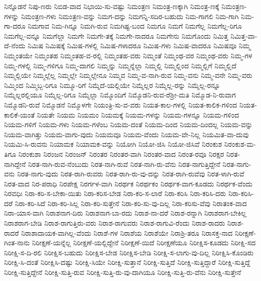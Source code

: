 {ನಿನ್ನೊಡನೆ
ನಿಪು-ಣರು
ನಿಬಿಡ-ವಾದ
ನಿಭಾಯಿ-ಸು-ವಷ್ಟು
ನಿಮಂತ್ರಣ
ನಿಮಂತ್ರ-ಣಕ್ಕಾಗಿ
ನಿಮಂತ್ರ-ಣಕ್ಕೆ
ನಿಮಂತ್ರಣ-ಗಳನ್ನು
ನಿಮಂತ್ರಣ-ಗಳು
ನಿಮಂತ್ರಣ-ವನ್ನು
ನಿಮಗ-ದನ್ನು
ನಿಮಗನ್ನಿ-ಸದಿರ-ಬಹುದು
ನಿಮ-ಗಾಗಲಿ
ನಿಮ-ಗಾಗಿ
ನಿಮ-ಗಾ-ದರೂ
ನಿಮಗಾವ
ನಿಮ-ಗಿನ್ನೂ
ನಿಮಗಿ-ರುವ
ನಿಮಗಿಷ್ಟ-ಬಂದ
ನಿಮಗೂ
ನಿಮಗೆ
ನಿಮಗೆಲ್ಲ
ನಿಮಗೆಲ್ಲ-ರಿಗೂ
ನಿಮಗೆಲ್ಲ-ವನ್ನೂ
ನಿಮಗೆಲ್ಲಾ
ನಿಮಗೇ
ನಿಮಗೇ-ತಕ್ಕೆ
ನಿಮಗೇ-ನಾದರೂ
ನಿಮಗೇನು
ನಿಮಗೊಂದು
ನಿಮಿತ್ತ
ನಿಮಿತ್ತ-ವಾ-ದೆ-ನೆಂದು
ನಿಮಿಷ
ನಿಮಿಷಕ್ಕೆ
ನಿಮಿಷ-ಗಳಲ್ಲಿ
ನಿಮಿಷ-ಗಳಾದರೂ
ನಿಮಿಷ-ಗಳು
ನಿಮಿಷ-ವಾದರೂ
ನಿಮಿಷವೂ
ನಿಮ್ಮ
ನಿಮ್ಮಂತಯೇ
ನಿಮ್ಮಂತಹ
ನಿಮ್ಮಂತಹ-ವ-ರಲ್ಲಿ
ನಿಮ್ಮಂತಹ-ವರು
ನಿಮ್ಮಂತೆ
ನಿಮ್ಮಂಥ-ವರ
ನಿಮ್ಮಂಥ-ವರು
ನಿಮ್ಮ-ಗಳ
ನಿಮ್ಮ-ಗಳಲ್ಲಿ
ನಿಮ್ಮ-ಗಳಿಗೂ
ನಿಮ್ಮ-ದಾಗಲಿ
ನಿಮ್ಮನ್ನು
ನಿಮ್ಮನ್ನೆಲ್ಲಾ
ನಿಮ್ಮಲ್ಲಿ
ನಿಮ್ಮಲ್ಲಿಂದ
ನಿಮ್ಮಲ್ಲಿಗೆ
ನಿಮ್ಮಲ್ಲಿದೆ
ನಿಮ್ಮಲ್ಲಿಯೇ
ನಿಮ್ಮಲ್ಲೆಲ್ಲ
ನಿಮ್ಮಲ್ಲೇ
ನಿಮ್ಮಲ್ಲೇನೂ
ನಿಮ್ಮವ
ನಿಮ್ಮ-ವ-ನಾಗಿ-ರುವ
ನಿಮ್ಮ-ವನು
ನಿಮ್ಮ-ವನೇ
ನಿಮ್ಮ-ವರು
ನಿಮ್ಮಿಂದ
ನಿಮ್ಮಿಬ್ಬ-ರಿಗೂ
ನಿಮ್ಮೂ-ರಿಗೆ
ನಿಮ್ಮೆದೆ-ಯಲ್ಲಿಯೇ
ನಿಮ್ಮೆಲ್ಲರ
ನಿಮ್ಮೆಲ್ಲ-ರನ್ನು
ನಿಮ್ಮೆಲ್ಲ-ರನ್ನೂ
ನಿಮ್ಮೆಲ್ಲರಲ್ಲಿಯೂ
ನಿಮ್ಮೆಲ್ಲ-ರಿಗೂ
ನಿಮ್ಮೆಲ್ಲಾ
ನಿಮ್ಮೊಂದಿಗೆ
ನಿಮ್ಮೊಡನಿ-ರುವ-ರೆಶ್ರೀ-ಮತಿ
ನಿಮ್ಮೊಡ-ನಿ-ರುವಾಗ
ನಿಮ್ಮೊಡನಿ-ರುವೆ
ನಿಮ್ಮೊಡನೆ
ನಿಮ್ಮೊಳಗೇ
ನಿಯಂತ್ರಿ-ಸು-ವ-ವರು
ನಿಯತ-ಕಾಲ-ಗಳಲ್ಲಿ
ನಿಯತ-ಕಾಲಿಕ-ಗಳಿಂದ
ನಿಯತ-ಕಾಲಿಕೆ-ಯಂತೆ
ನಿಯತೇ
ನಿಯಮ
ನಿಯಮಂ
ನಿಯಮಕ್ಕೆ
ನಿಯಮ-ಗಳನ್ನು
ನಿಯಮ-ಗಳನ್ನೂ
ನಿಯಮ-ಗಳಿಂದ
ನಿಯಮ-ಗಳಿಗೆ
ನಿಯಮ-ಗಳು
ನಿಯಮ-ಗಳೆಂಬ
ನಿಯಮ-ದಂತೆ
ನಿಯಮ-ದಿಂದ
ನಿಯಮ-ದಿಂದಲ್ಲ
ನಿಯಮ-ವನ್ನು
ನಿಯಮ-ವಾಗಿತ್ತು
ನಿಯಮ-ವಾಗು-ವುದು
ನಿಯಮವೂ
ನಿಯಮ-ವೆಂದು
ನಿಯಮ-ವೇ-ನಿಲ್ಲ
ನಿಯಮಿತ-ವಾ-ದುವು
ನಿಯಮಿ-ಸಿ-ರುವನು
ನಿಯಾಮಕ
ನಿಯಾಮಕ-ವನ್ನು
ನಿಯೋಗಿ
ನಿಯೋ-ಜಿಸಿ
ನಿಯೋ-ಜಿಸಿವೆ
ನಿರಂಕುಶ
ನಿರಂಕುಶ-ಮ-ತಿಗೂ
ನಿರಂಕುಶಾ
ನಿರಂಜನ
ನಿರಂಜನ್
ನಿರಂತರ
ನಿರಂತರ-ವಾಗಿ
ನಿರಂತರ-ವಾದ
ನಿರಂತ-ರವೂ
ನಿರಕ್ಷರ
ನಿರತ-ನಾಗಿದ್ದೇನೆ
ನಿರತ-ನಾಗಿ-ರುವ-ನೆಂಬುದು
ನಿರತ-ನಾಗಿ-ರುವೆ
ನಿರತ-ನಾಗಿ-ರು-ವೆನು
ನಿರತ-ನಾಗುತ್ತಿದ್ದೇನೆ
ನಿರತ-ನಾಗು-ವನು
ನಿರತ-ನಾಗು-ವುದು
ನಿರತ-ರಾಗಿ-ರುವರು
ನಿರತ-ರಾಗಿ-ರು-ವು-ದನ್ನು
ನಿರತ-ರಾಗಿ-ರುವೆವು
ನಿರತ-ಳಾಗಿ-ರುವೆ
ನಿರತ-ವಾದ
ನಿರ-ಪರಾಧಿ
ನಿರಪೇಕ್ಷ
ನಿರರ್ಗಳ-ವಾಗಿ
ನಿರರ್ಥಕ
ನಿರರ್ಥಕಂ
ನಿರರ್ಥಕ-ವಾಗ-ಕೂಡದು
ನಿರರ್ಥಕ-ವೆಂದು
ನಿರವಧಿಃ
ನಿರಾ-ಕರಿ-ಸ-ಬೇಕಾ-ಯಿತು
ನಿರಾ-ಕರಿಸ-ಬೇಡ
ನಿರಾ-ಕರಿ-ಸ-ಲಾರೆ
ನಿರಾ-ಕರಿಸಿ
ನಿರಾ-ಕರಿಸಿ-ದರು
ನಿರಾ-ಕರಿಸಿ-ದರೆ
ನಿರಾ-ಕರಿ-ಸಿದೆ
ನಿರಾ-ಕರಿ-ಸಿಲ್ಲ
ನಿರಾ-ಕರಿ-ಸುತ್ತೇನೆ
ನಿರಾ-ಕರಿ-ಸು-ವು-ದಿಲ್ಲ
ನಿರಾ-ಕರಿಸು-ವೆವು
ನಿರಾತಂಕ-ವಾದ
ನಿರಾ-ಯಾಸ-ವಾಗಿ
ನಿರಾಶನಾಗ-ದಿರು
ನಿರಾಶನಾಗ-ಬಾ-ರದು
ನಿರಾಶ-ನಾ-ದರೆ
ನಿರಾಶ-ರನ್ನಾಗಿ
ನಿರಾಶರಾಗ-ಬೇಕಿಲ್ಲ
ನಿರಾಶರಾಗ-ಬೇಡಿ
ನಿರಾಶ-ರಾಗುತ್ತಿರು-ವರು
ನಿರಾಶ-ರಾಗುವರು
ನಿರಾಶ-ರಾಗುವಿ-ರೆಂದು
ನಿರಾಶ-ರಾದರು
ನಿರಾಶ-ರಾದರೆ
ನಿರಾಶಾದಾಯಕ-ವಾಗಿಲ್ಲ-ವೆಂದು
ನಿರಾಶೆ-ಗಳ
ನಿರಾಶೆಯ
ನಿರಾಶೆಯೇ
ನಿರಾಶ್ರಿ-ತರೂ
ನಿರಾಸಕ್ತ-ನಾದ
ನಿರೀಕ್ಷಣೆ-ಗಿಂತ-ನಾನು
ನಿರೀಕ್ಷಣೆ-ಯನ್ನೆಲ್ಲ
ನಿರೀಕ್ಷಣೆ-ಯಲ್ಲಿದ್ದೇನೆ
ನಿರೀಕ್ಷಣೆ-ಯಿದೆ
ನಿರೀಕ್ಷಣೆಯೂ
ನಿರೀಕ್ಷಿಸ-ಕೂಡದು
ನಿರೀಕ್ಷಿ-ಸದ
ನಿರೀಕ್ಷಿ-ಸ-ದಿ-ರಲಿ
ನಿರೀಕ್ಷಿಸ-ಬಹುದು
ನಿರೀಕ್ಷಿಸ-ಬೇಡ
ನಿರೀಕ್ಷಿಸ-ಬೇಡಿ
ನಿರೀಕ್ಷಿ-ಸ-ಲಾಗು-ವು-ದಿಲ್ಲ
ನಿರೀಕ್ಷಿಸಿ-ಕೊಂಡಿರು
ನಿರೀಕ್ಷಿ-ಸಿ-ದಂತೆ
ನಿರೀಕ್ಷಿಸಿ-ದಷ್ಟು
ನಿರೀಕ್ಷಿ-ಸಿಯೇ
ನಿರೀಕ್ಷಿ-ಸುತ್ತಾನೆ
ನಿರೀಕ್ಷಿ-ಸುತ್ತಿದೆ
ನಿರೀಕ್ಷಿ-ಸುತ್ತಿದ್ದಾರೆ
ನಿರೀಕ್ಷಿ-ಸುತ್ತಿದ್ದೆ
ನಿರೀಕ್ಷಿ-ಸುತ್ತಿದ್ದೇನೆ
ನಿರೀಕ್ಷಿ-ಸುತ್ತಿ-ರುವ
ನಿರೀಕ್ಷಿ-ಸುತ್ತಿ-ರು-ವು-ದಾಗಿಯೂ
ನಿರೀಕ್ಷಿ-ಸುತ್ತಿ-ರು-ವೆನು
ನಿರೀಕ್ಷಿ-ಸುತ್ತೇನೆ
}
